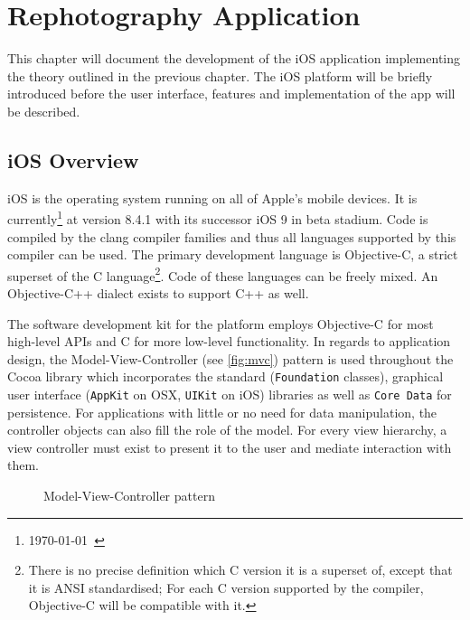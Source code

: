 \chapter{Rephotography Application}

This chapter will document the development of the iOS application implementing
the theory outlined in the previous chapter. The iOS platform will be briefly
introduced before the user interface, features and implementation of the app
will be described.

\section{iOS Overview}
\newcommand*{\code}[1]{\texttt{#1}}

iOS is the operating system running on all of Apple's mobile devices. It is
currently\footnote{\today\ \citep{ios8}} at version 8.4.1 with its successor iOS
9 in beta stadium. Code is compiled by the clang compiler families and thus all
languages supported by this compiler can be used. The primary development
language is Objective-C, a strict superset of the C language\footnote{There is
   no precise definition which C version it is a superset of, except that it is
   ANSI standardised; For each C version supported by the compiler, Objective-C
will be compatible with it.}. Code of these languages can be freely mixed. An
Objective-C++ dialect exists to support C++ as well.

The software development kit for the platform employs Objective-C for most
high-level APIs and C for more low-level functionality. In regards to
application design, the Model-View-Controller (see \autoref{fig:mvc}) pattern is
used throughout the Cocoa library which incorporates the standard
(\code{Foundation} classes), graphical user interface (\code{AppKit} on OSX,
\code{UIKit} on iOS) libraries as well as \code{Core Data} for persistence. For
applications with little or no need for data manipulation, the controller
objects can also fill the role of the model.  For every view hierarchy, a view
controller must exist to present it to the user and mediate interaction with
them.

\begin{figure}[h]
   {\centering      
      
      \caption{Model-View-Controller pattern}
   \label{fig:mvc}}
\end{figure}

